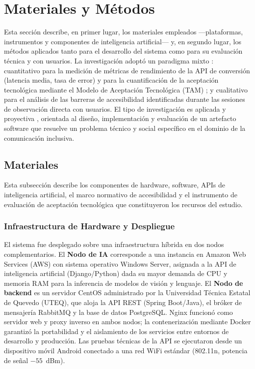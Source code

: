 \documentclass[journal]{IEEEtran}
\begin{document}
	\section{Materiales y M\'etodos}
	\label{sec:metodologia}
	Esta secci\'on describe, en primer lugar, los materiales empleados ---plataformas, instrumentos y componentes de inteligencia artificial--- y, en segundo lugar, los m\'etodos aplicados tanto para el desarrollo del sistema como para su evaluaci\'on t\'ecnica y con usuarios. La investigaci\'on adopt\'o un paradigma mixto \cite{hernandez2014}: cuantitativo para la medici\'on de m\'etricas de rendimiento de la API de conversi\'on (latencia media, tasa de error) y para la cuantificaci\'on de la aceptaci\'on tecnol\'ogica mediante el Modelo de Aceptaci\'on Tecnol\'ogica (TAM) \cite{davis1989}; y cualitativo para el an\'alisis de las barreras de accesibilidad identificadas durante las sesiones de observaci\'on directa con usuarios. El tipo de investigaci\'on es aplicada y proyectiva \cite{hernandez2014}, orientada al dise\~no, implementaci\'on y evaluaci\'on de un artefacto software que resuelve un problema t\'ecnico y social espec\'ifico en el dominio de la comunicaci\'on inclusiva.
	
	\subsection{Materiales}
	Esta subsecci\'on describe los componentes de hardware, software, APIs de inteligencia artificial, el marco normativo de accesibilidad y el instrumento de evaluaci\'on de aceptaci\'on tecnol\'ogica que constituyeron los recursos del estudio.
	
	\subsubsection{Infraestructura de Hardware y Despliegue}
	El sistema fue desplegado sobre una infraestructura h\'ibrida en dos nodos complementarios. El \textbf{Nodo de IA} corresponde a una instancia en Amazon Web Services (AWS) con sistema operativo Windows Server, asignada a la API de inteligencia artificial (Django/Python) dada su mayor demanda de CPU y memoria RAM para la inferencia de modelos de visi\'on y lenguaje. El \textbf{Nodo de backend} es un servidor CentOS administrado por la Universidad T\'ecnica Estatal de Quevedo (UTEQ), que aloja la API REST (Spring Boot/Java), el br\'oker de mensajer\'ia RabbitMQ y la base de datos PostgreSQL. Nginx funcion\'o como servidor web y proxy inverso en ambos nodos; la contenerizaci\'on mediante Docker garantiz\'o la portabilidad y el aislamiento de los servicios entre entornos de desarrollo y producci\'on. Las pruebas t\'ecnicas de la API se ejecutaron desde un dispositivo m\'ovil Android conectado a una red WiFi est\'andar (802.11n, potencia de se\~nal $-55$~dBm).
	
\end{document}
